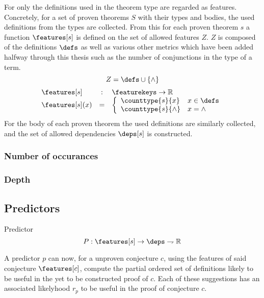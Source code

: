 For \roerei only the definitions used in the theorem type are regarded as features.
Concretely, for a set of proven theorems $S$ with their types and bodies, the used definitions from the types are collected.
From this for each proven theorem $s$ a function $\features[s]$ is defined on the set of allowed features $Z$.
$Z$ is composed of the definitions $\defs$ as well as various other metrics which have been added halfway through this thesis such as the number of conjunctions in the type of a term.
$$ Z = \defs \cup \{ \wedge \} $$
$$
\begin{array}{lcl}
	\features[s] & : & \featurekeys \rightarrow \mathbb{R} \\
	\features[s](x) & = & \left\{
		\begin{array}{ll}
			\counttype{s}{x} & x \in \defs \\
			\counttype{s}{\wedge} & x = \wedge
		\end{array} \right.
\end{array}
$$
For the body of each proven theorem the used definitions are similarly collected, and the set of allowed dependencies $\deps[s]$ is constructed.

\subsubsection{Number of occurances}
\label{section:countoccur}

\subsubsection{Depth}
\label{section:depth}

\subsection{Predictors}

\begin{definition}{Predictor}
	\[ P : \features[s] \rightarrow \deps \rightharpoondown \mathbb{R} \]
\end{definition}

A predictor $p$ can now, for a unproven conjecture $c$,
using the features of said conjecture $\features[c]$,
compute the partial ordered set of definitions likely to be useful in the yet to be constructed proof of $c$.
Each of these suggestions has an associated likelyhood $r_p$ to be useful in the proof of conjecture $c$.

